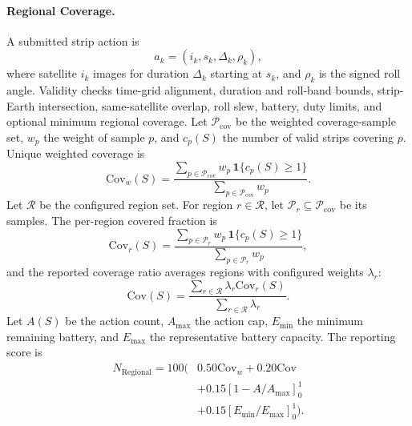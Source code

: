 \documentclass[]{mosi}
\begin{document}
\paragraph{Regional Coverage.} A submitted strip action is
\[
  a_k=(i_k,s_k,\Delta_k,\rho_k),
\]
where satellite \(i_k\) images for duration \(\Delta_k\) starting at \(s_k\), and \(\rho_k\) is the signed roll angle. Validity checks time-grid alignment, duration and roll-band bounds, strip-Earth intersection, same-satellite overlap, roll slew, battery, duty limits, and optional minimum regional coverage. Let \(\mathcal{P}_{\mathrm{cov}}\) be the weighted coverage-sample set, \(w_p\) the weight of sample \(p\), and \(c_p(S)\) the number of valid strips covering \(p\). Unique weighted coverage is
\[
  \mathrm{Cov}_w(S)=
  \frac{\sum_{p\in\mathcal{P}_{\mathrm{cov}}} w_p\,\mathbf{1}\{c_p(S)\ge 1\}}{\sum_{p\in\mathcal{P}_{\mathrm{cov}}}w_p}.
\]
Let \(\mathcal{R}\) be the configured region set. For region \(r\in\mathcal{R}\), let \(\mathcal{P}_r\subseteq\mathcal{P}_{\mathrm{cov}}\) be its samples. The per-region covered fraction is
\[
  \mathrm{Cov}_r(S)=
  \frac{\sum_{p\in\mathcal{P}_r} w_p\,\mathbf{1}\{c_p(S)\ge 1\}}{\sum_{p\in\mathcal{P}_r}w_p},
\]
and the reported coverage ratio averages regions with configured weights \(\lambda_r\):
\[
  \mathrm{Cov}(S)=
  \frac{\sum_{r\in\mathcal{R}} \lambda_r\mathrm{Cov}_r(S)}{\sum_{r\in\mathcal{R}}\lambda_r}.
\]
Let \(A(S)\) be the action count, \(A_{\max}\) the action cap, \(E_{\min}\) the minimum remaining battery, and \(E_{\max}\) the representative battery capacity. The reporting score is
\[
  \begin{aligned}
  N_{\mathrm{Regional}}=100(&0.50\mathrm{Cov}_w+0.20\mathrm{Cov}\\
  &+0.15[1-A/A_{\max}]_0^1\\
  &+0.15[E_{\min}/E_{\max}]_0^1).
  \end{aligned}
\]
\end{document}
